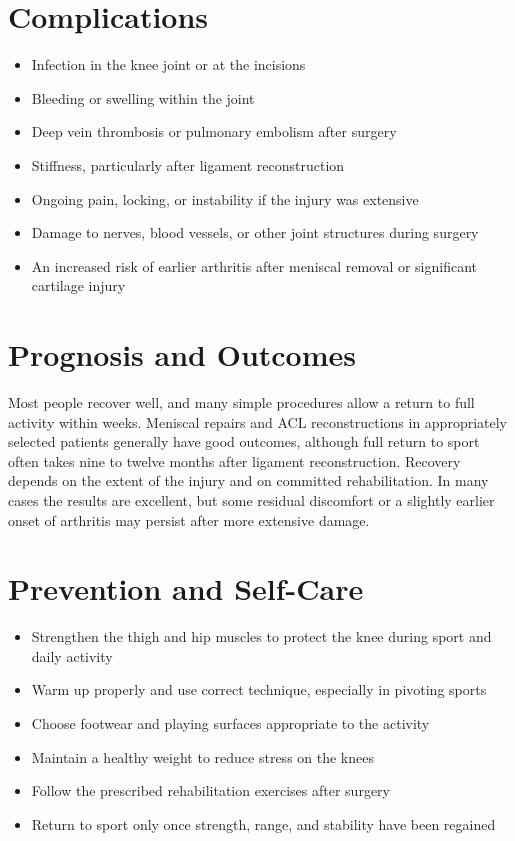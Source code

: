 \section*{Complications}
\begin{itemize}
    \item Infection in the knee joint or at the incisions
    \item Bleeding or swelling within the joint
    \item Deep vein thrombosis or pulmonary embolism after surgery
    \item Stiffness, particularly after ligament reconstruction
    \item Ongoing pain, locking, or instability if the injury was extensive
    \item Damage to nerves, blood vessels, or other joint structures during surgery
    \item An increased risk of earlier arthritis after meniscal removal or significant cartilage injury
\end{itemize}

\section*{Prognosis and Outcomes}
Most people recover well, and many simple procedures allow a return to full activity within weeks. Meniscal repairs and ACL reconstructions in appropriately selected patients generally have good outcomes, although full return to sport often takes nine to twelve months after ligament reconstruction. Recovery depends on the extent of the injury and on committed rehabilitation. In many cases the results are excellent, but some residual discomfort or a slightly earlier onset of arthritis may persist after more extensive damage.

\section*{Prevention and Self-Care}
\begin{itemize}
    \item Strengthen the thigh and hip muscles to protect the knee during sport and daily activity
    \item Warm up properly and use correct technique, especially in pivoting sports
    \item Choose footwear and playing surfaces appropriate to the activity
    \item Maintain a healthy weight to reduce stress on the knees
    \item Follow the prescribed rehabilitation exercises after surgery
    \item Return to sport only once strength, range, and stability have been regained
\end{itemize}

